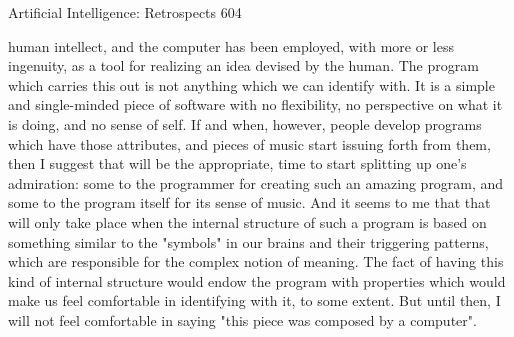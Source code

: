 {Artificial Intelligence: Retrospects                                                     604

human intellect, and the computer has been employed, with more or less ingenuity, as a
tool for realizing an idea devised by the human. The program which carries this out is not
anything which we can identify with. It is a simple and single-minded piece of software
with no flexibility, no perspective on what it is doing, and no sense of self. If and when,
however, people develop programs which have those attributes, and pieces of music start
issuing forth from them, then I suggest that will be the appropriate, time to start splitting
up one's admiration: some to the programmer for creating such an amazing program, and
some to the program itself for its sense of music. And it seems to me that that will only
take place when the internal structure of such a program is based on something similar to
the "symbols" in our brains and their triggering patterns, which are responsible for the
complex notion of meaning. The fact of having this kind of internal structure would
endow the program with properties which would make us feel comfortable in identifying
with it, to some extent. But until then, I will not feel comfortable in saying "this piece
was composed by a computer".

}
